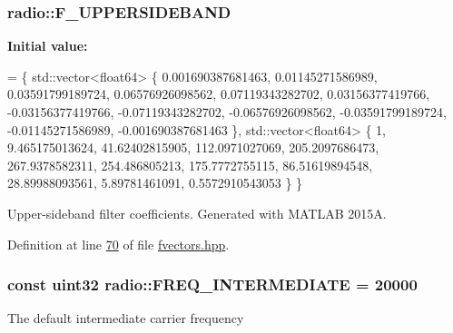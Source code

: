 \hypertarget{namespaceradio_a0ec4548711b6d6ed6867c70b3fc2a413}{
\subsubsection[{F\+\_\+\+U\+P\+P\+E\+R\+S\+I\+D\+E\+B\+A\+N\+D}]{ radio\+::\+F\+\_\+\+U\+P\+P\+E\+R\+S\+I\+D\+E\+B\+A\+N\+D}}\label{namespaceradio_a0ec4548711b6d6ed6867c70b3fc2a413}
{\bfseries Initial value\+:}
\begin{DoxyCode}
= \{ std::vector<float64> \{
        0.001690387681463, 
            0.01145271586989, 
            0.03591799189724, 
            0.06576926098562,
            0.07119343282702,
            0.03156377419766,
            -0.03156377419766,
            -0.07119343282702,
            -0.06576926098562,
            -0.03591799189724,
            -0.01145271586989,
            -0.001690387681463
    \}, std::vector<float64> \{
        1,  
            9.465175013624,
            41.62402815905,
            112.0971027069,
            205.2097686473,    
            267.9378582311,     
            254.486805213,
            175.7772755115,
            86.51619894548,   
            28.89988093561,     
            5.89781461091,
            0.5572910543053   
    \} \}
\end{DoxyCode}
Upper-\/sideband filter coefficients. Generated with M\+A\+T\+L\+A\+B 2015\+A. 

Definition at line \hyperlink{fvectors_8hpp_source_l00070}{70} of file \hyperlink{fvectors_8hpp_source}{fvectors.\+hpp}.

\hypertarget{namespaceradio_aa82ddc6ba206798fd70ffc25665b3cb6}{
\subsubsection[{F\+R\+E\+Q\+\_\+\+I\+N\+T\+E\+R\+M\+E\+D\+I\+A\+T\+E}]{\setlength{\rightskip}{0pt plus 5cm}const {\bf uint32} radio\+::\+F\+R\+E\+Q\+\_\+\+I\+N\+T\+E\+R\+M\+E\+D\+I\+A\+T\+E = 20000}}\label{namespaceradio_aa82ddc6ba206798fd70ffc25665b3cb6}
The default intermediate carrier frequency 

